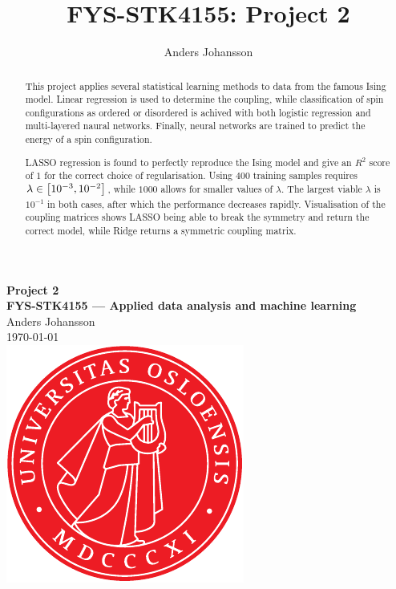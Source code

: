 \documentclass[11pt,british,a4paper]{article}
\numberwithin{equation}{section}
\begin{document}
\tikzexternaldisable
\title{FYS-STK4155: Project 2}
\author{Anders Johansson}

\begin{titlepage}
\vspace*{\fill}
\begin{center}
\textsf{
    \Huge \textbf{Project 2}\\\vspace{0.5cm}
    \Large \textbf{FYS-STK4155 --- Applied data analysis and machine learning}\\
    \vspace{8cm}
    Anders Johansson\\
    \today\\
}
\vspace{1.5cm}
\includegraphics{uio.pdf}\\
\vspace*{\fill}
\end{center}
\end{titlepage}
\null
\pagestyle{empty}
\newpage

\pagestyle{fancy}
\setcounter{page}{1}

\begin{abstract}
    This project applies several statistical learning methods to data from the famous Ising model.
    Linear regression is used to determine the coupling, while classification of spin configurations as ordered or disordered is achived with both logistic regression and multi-layered naural networks.
    Finally, neural networks are trained to predict the energy of a spin configuration.

    LASSO regression is found to perfectly reproduce the Ising model and give an \(R^2\) score of \(1\) for the correct choice of regularisation.
    Using \(\num{400}\) training samples requires \(\lambda\in\qty[10^{-3},10^{-2}]\), while \(\num{1000}\) allows for smaller values of \(\lambda\).
    The largest viable \(\lambda\) is \(10^{-1}\) in both cases, after which the performance decreases rapidly.
    Visualisation of the coupling matrices shows LASSO being able to break the symmetry and return the correct model, while Ridge returns a symmetric coupling matrix.
\end{abstract}
\end{document}
